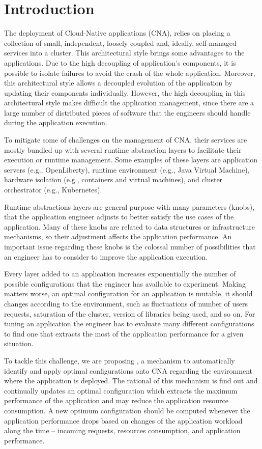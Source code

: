 \section{Introduction}

The deployment of Cloud-Native applications (CNA), relies on placing a
collection of small, independent, loosely coupled and, ideally, self-managed
services into a cluster. This architectural style brings some advantages to the
applications. Due to the high decoupling of application's components, it is
possible to isolate failures to avoid the crash of the whole application.
Moreover, this architectural style allows a decoupled evolution of the
application by updating their components individually. However, the high
decoupling in this architectural style makes difficult the application
management, since there are a large number of distributed pieces of software
that the engineers should handle during the application execution.

To mitigate some of challenges on the management of CNA, their services are
mostly bundled up with several runtime abstraction layers to facilitate their
execution or runtime management. Some examples of these layers are application
servers (e.g., OpenLiberty), runtime environment (e.g., Java Virtual Machine),
hardware isolation (e.g., containers and virtual machines), and cluster
orchestrator (e.g., Kubernetes).

Runtime abstractions layers are general purpose with many parameters (knobs),
that the application engineer adjusts to better satisfy the use cases of the
application. Many of these knobs are related to data structures or
infrastructure mechanisms, so their adjustment affects the application
performance. An important issue regarding these knobs is the colossal number of
possibilities that an engineer has to consider to improve the application
execution.

Every layer added to an application increases exponentially the number of
possible configurations that the engineer has available to experiment. Making
matters worse, an optimal configuration for an application is mutable, it should
changes according to the environment, such as fluctuations of number of users
requests, saturation of the cluster, version of libraries being used, and so on.
For tuning an application the engineer has to evaluate many different
configurations to find one that extracts the most of the application performance
for a given situation.

To tackle this challenge, we are proposing \name, a mechanism to automatically
identify and apply optimal configurations onto CNA regarding the environment
where the application is deployed. The rational of this mechanism is find out
and continually updates an optimal configuration which extracts the maximum
performance of the application and may reduce the application resource
consumption. A new optimum configuration should be computed whenever the
application performance drops based on changes of the application workload along
the time -- incoming requests, resources consumption, and application
performance.
